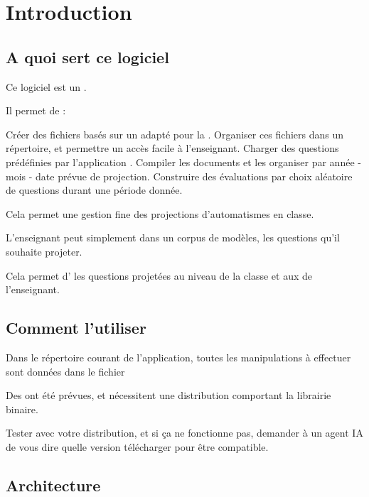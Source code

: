 \section{Introduction}

\subsection{A quoi sert ce logiciel}
Ce logiciel est un . 

Il permet de :
\begin{tcbenumerate}
    \tcbitem Créer des fichiers \frquote{\LaTeX} basés sur un  adapté pour la . 
    \tcbitem Organiser ces fichiers dans un répertoire, et permettre un accès facile à l'enseignant. 
    \tcbitem Charger des questions prédéfinies par l'application .
    \tcbitem Compiler les documents et les organiser par année - mois - date prévue de projection. 
    \tcbitem Construire des évaluations par choix aléatoire de questions durant une période donnée.
\end{tcbenumerate}

Cela permet une gestion fine des projections d'automatismes en classe. 

L'enseignant peut simplement  dans un corpus de modèles, les questions qu'il souhaite projeter. 

Cela permet d' les questions projetées au niveau de la classe et aux  de l'enseignant. 


\subsection{Comment l'utiliser}

Dans le répertoire courant de l'application, toutes les manipulations à effectuer sont données dans le fichier 

Des   ont été prévues, et nécessitent une distribution  comportant la librairie  binaire. 

Tester avec votre distribution, et si ça ne fonctionne pas, demander à un agent IA de vous dire quelle version télécharger pour être compatible. 

\newpage
\subsection{Architecture}

